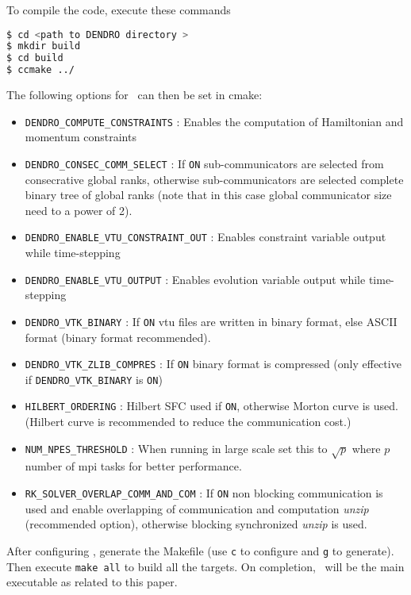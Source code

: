 To compile the code, execute these commands
\begin{lstlisting}[language=bash]
$ cd <path to DENDRO directory >
$ mkdir build
$ cd build
$ ccmake ../     
\end{lstlisting}
The following options for \dendro\  can then be set in cmake:
\begin{itemize}
	\item \texttt{DENDRO\_COMPUTE\_CONSTRAINTS} : Enables the computation of Hamiltonian and momentum constraints
	\item \texttt{DENDRO\_CONSEC\_COMM\_SELECT}  : If \texttt{ON} sub-communicators are selected from consecrative global ranks, otherwise sub-communicators are selected complete binary tree of global ranks (note that in this case global communicator size need to a power of 2).
	\item \texttt{DENDRO\_ENABLE\_VTU\_CONSTRAINT\_OUT} : Enables constraint variable output \linebreak while time-stepping 
	\item \texttt{DENDRO\_ENABLE\_VTU\_OUTPUT} : Enables evolution variable output while time-stepping
	\item \texttt{DENDRO\_VTK\_BINARY} : If \texttt{ON} vtu files are written in binary format, else ASCII format (binary format recommended).
	\item \texttt{DENDRO\_VTK\_ZLIB\_COMPRES} : If \texttt{ON} binary format is compressed (only effective if \texttt{DENDRO\_VTK\_BINARY} is \texttt{ON})
	\item \texttt{HILBERT\_ORDERING} : Hilbert SFC used if \texttt{ON}, otherwise Morton curve is used. (Hilbert curve is recommended to reduce the communication cost.)
	\item \texttt{NUM\_NPES\_THRESHOLD} : When running in large scale set this to $\sqrt{p}$ where $p$ number of mpi tasks for better performance.
	\item \texttt{RK\_SOLVER\_OVERLAP\_COMM\_AND\_COM} : If \texttt{ON} non blocking communication is used and enable overlapping of communication and computation \textit{unzip} (recommended option), otherwise blocking synchronized \textit{unzip} is used.  	
\end{itemize}

After configuring \dendro, generate the Makefile (use \texttt{c} to configure and \texttt{g} to generate). Then execute \texttt{make all} to build all the targets.  On completion, \bsolver~will be the main executable as related to this paper. 

